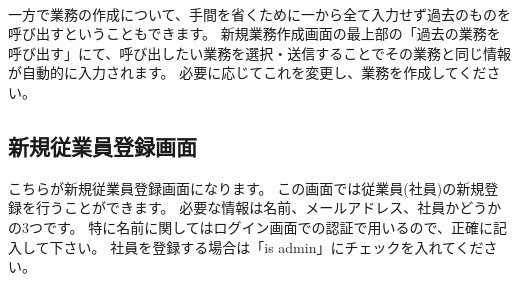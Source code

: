 \documentclass[11pt, a4paper]{jarticle}
\begin{document}
		\begin{figure}[htbp]
			\begin{minipage}[b]{\linewidth}
				\centering
			\end{minipage} \\
			\begin{minipage}[b]{\linewidth}
				\centering
			\end{minipage}
		\end{figure}
		一方で業務の作成について、手間を省くために一から全て入力せず過去のものを呼び出すということもできます。
		新規業務作成画面の最上部の「過去の業務を呼び出す」にて、呼び出したい業務を選択・送信することでその業務と同じ情報が自動的に入力されます。
		必要に応じてこれを変更し、業務を作成してください。
		\clearpage


	\subsection{新規従業員登録画面}
		\begin{figure}[htbp]
			\centering
		\end{figure}
		こちらが新規従業員登録画面になります。
		この画面では従業員(社員)の新規登録を行うことができます。
		必要な情報は名前、メールアドレス、社員かどうかの3つです。
		特に名前に関してはログイン画面での認証で用いるので、正確に記入して下さい。
		社員を登録する場合は「is admin」にチェックを入れてください。
		\par
\end{document}

